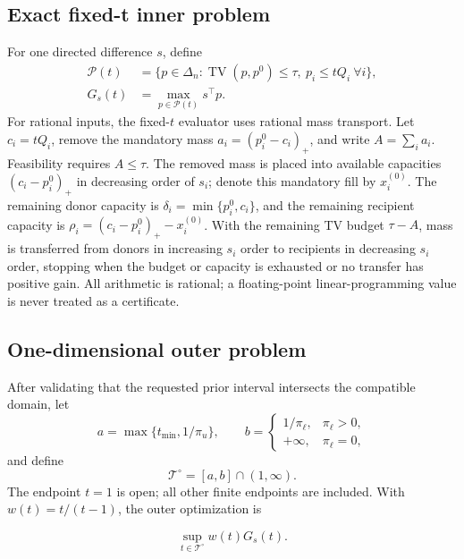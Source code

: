 \documentclass[preprint,review,12pt]{elsarticle}
\newcommand{\TV}{\operatorname{TV}}
\begin{document}
\subsection{Exact fixed-t inner problem}

For one directed difference \(s\), define
\begin{align}
\mathcal{P}(t)
&=\{p\in\Delta_n:\TV(p,p^0)\leq\tau,\ p_i\leq tQ_i\ \forall i\},\\
G_s(t)&=\max_{p\in\mathcal{P}(t)}s^\top p.
\label{eq:general-inner-value}
\end{align}
For rational inputs, the fixed-\(t\) evaluator uses rational mass transport.
Let \(c_i=tQ_i\), remove the mandatory mass
\(a_i=(p_i^0-c_i)_+\), and write \(A=\sum_i a_i\). Feasibility requires
\(A\leq\tau\). The removed mass is placed into available capacities
\((c_i-p_i^0)_+\) in decreasing order of \(s_i\); denote this mandatory fill by
\(x_i^{(0)}\). The remaining donor capacity is
\(\delta_i=\min\{p_i^0,c_i\}\), and the remaining recipient capacity is
\(\rho_i=(c_i-p_i^0)_+-x_i^{(0)}\). With the remaining TV budget \(\tau-A\),
mass is transferred from donors in increasing \(s_i\) order to recipients in
decreasing \(s_i\) order, stopping when the budget or capacity is exhausted or
no transfer has positive gain. All arithmetic is rational; a floating-point
linear-programming value is never treated as a certificate.

\subsection{One-dimensional outer problem}

After validating that the requested prior interval intersects the compatible
domain, let
\[
a=\max\{t_{\min},1/\pi_u\},\qquad
b=\begin{cases}1/\pi_\ell,&\pi_\ell>0,\\+\infty,&\pi_\ell=0,\end{cases}
\]
and define
\[
\mathcal{T}^{\circ}=[a,b]\cap(1,\infty).
\]
The endpoint \(t=1\) is open; all other finite endpoints are included. With
\(w(t)=t/(t-1)\), the outer optimization is

\begin{equation}
\sup_{t\in\mathcal{T}^{\circ}}w(t)G_s(t).
\label{eq:outer-problem}
\end{equation}
\end{document}
